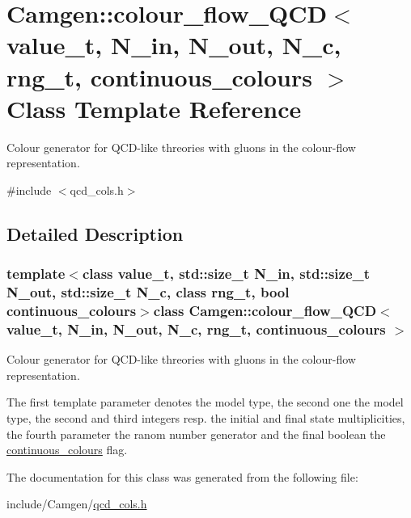 \hypertarget{a00074}{}\section{Camgen\+:\+:colour\+\_\+flow\+\_\+\+Q\+C\+D$<$ value\+\_\+t, N\+\_\+in, N\+\_\+out, N\+\_\+c, rng\+\_\+t, continuous\+\_\+colours $>$ Class Template Reference}
\label{a00074}


Colour generator for Q\+C\+D-\/like threories with gluons in the colour-\/flow representation.  




{\ttfamily \#include $<$qcd\+\_\+cols.\+h$>$}



\subsection{Detailed Description}
\subsubsection*{template$<$class value\+\_\+t, std\+::size\+\_\+t N\+\_\+in, std\+::size\+\_\+t N\+\_\+out, std\+::size\+\_\+t N\+\_\+c, class rng\+\_\+t, bool continuous\+\_\+colours$>$class Camgen\+::colour\+\_\+flow\+\_\+\+Q\+C\+D$<$ value\+\_\+t, N\+\_\+in, N\+\_\+out, N\+\_\+c, rng\+\_\+t, continuous\+\_\+colours $>$}

Colour generator for Q\+C\+D-\/like threories with gluons in the colour-\/flow representation. 

The first template parameter denotes the model type, the second one the model type, the second and third integers resp. the initial and final state multiplicities, the fourth parameter the ranom number generator and the final boolean the \hyperlink{a00103}{continuous\+\_\+colours} flag. 

The documentation for this class was generated from the following file\+:\begin{DoxyCompactItemize}
\item 
include/\+Camgen/\hyperlink{a00752}{qcd\+\_\+cols.\+h}\end{DoxyCompactItemize}
